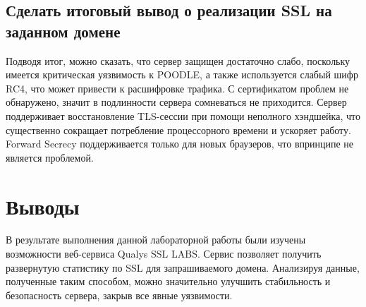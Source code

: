 \documentclass[a4paper, 14pt]{article}				%
\begin{document}
\subsection{Сделать итоговый вывод о реализации SSL на заданном домене}
Подводя итог, можно сказать, что сервер защищен достаточно слабо, поскольку имеется критическая уязвимость к POODLE,  а также используется слабый шифр RC4, что может привести к расшифровке трафика. С сертификатом проблем не обнаружено, значит в подлинности сервера сомневаться не приходится. Сервер поддерживает восстановление TLS-сессии при помощи неполного хэндшейка, что существенно сокращает потребление процессорного времени и ускоряет работу. Forward Secrecy поддерживается только для новых браузеров, что впринципе не является проблемой.

\section{Выводы}
В результате выполнения данной лабораторной работы были изучены возможности веб-сервиса Qualys SSL LABS. Сервис позволяет получить развернутую статистику по SSL для запрашиваемого домена. Анализируя данные, полученные таким способом, можно значительно улучшить стабильность и безопасность сервера, закрыв все явные уязвимости.
\end{document}
